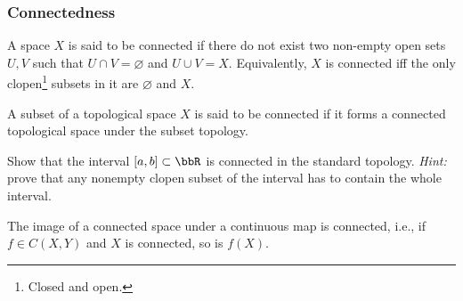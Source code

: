 
\subsubsection{Connectedness}

\begin{defn}
A space $X$ is said to be connected if there do not exist two non-empty open sets $U,V$ such that $U\cap V=\varnothing$ and $U\cup V=X$.
Equivalently, $X$ is connected iff the only clopen\footnote{Closed and open.} subsets in it are $\varnothing$ and $X$.
\end{defn}


\begin{defn}
A subset of a topological space $X$ is said to be connected if it forms a connected topological space under the subset topology.
\end{defn}

\begin{xca}
Show that the interval $[a,b]\subset\bbR $ is connected in the standard topology. \emph{Hint:} prove that any nonempty clopen subset of the interval has to contain the whole interval.
\end{xca}


\begin{prop}
The image of a connected space under a continuous map is connected, i.e., if $f\in C(X,Y)$ and $X$ is connected, so is $f(X)$.
\end{prop}

